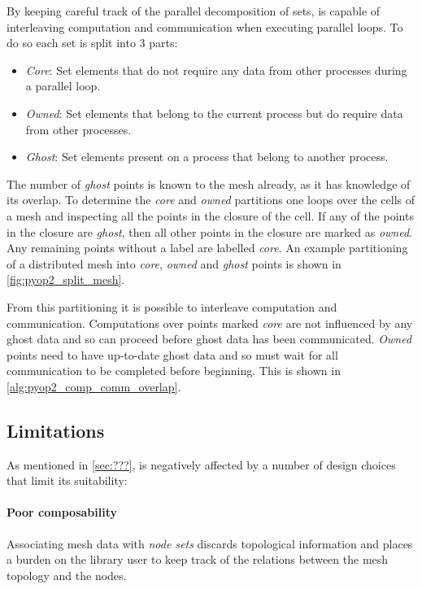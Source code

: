 \documentclass[thesis]{subfiles}
\begin{document}
By keeping careful track of the parallel decomposition of sets,  is capable of interleaving computation and communication when executing parallel loops.
To do so each set is split into 3 parts:

\begin{itemize}
  \item \textit{Core}: Set elements that do not require any data from other processes during a parallel loop.

  \item \textit{Owned}: Set elements that belong to the current process but do require data from other processes.

  \item \textit{Ghost}: Set elements present on a process that belong to another process.
\end{itemize}

The number of \textit{ghost} points is known to the mesh already, as it has knowledge of its overlap.
To determine the \textit{core} and \textit{owned} partitions one loops over the cells of a mesh and inspecting all the points in the closure of the cell.
If any of the points in the closure are \textit{ghost}, then all other points in the closure are marked as \textit{owned}.
Any remaining points without a label are labelled \textit{core}.
An example partitioning of a distributed mesh into \textit{core}, \textit{owned} and \textit{ghost} points is shown in \cref{fig:pyop2_split_mesh}.

From this partitioning it is possible to interleave computation and communication.
Computations over points marked \textit{core} are not influenced by any ghost data and so can proceed before ghost data has been communicated. \textit{Owned} points need to have up-to-date ghost data and so must wait for all communication to be completed before beginning.
This is shown in \cref{alg:pyop2_comp_comm_overlap}.

\subsection{Limitations}

As mentioned in \cref{sec:???},  is negatively affected by a number of design choices that limit its suitability:

\paragraph{Poor composability}{
  Associating mesh data with \textit{node sets} discards topological information and places a burden on the library user to keep track of the relations between the mesh topology and the nodes.
}
\end{document}
